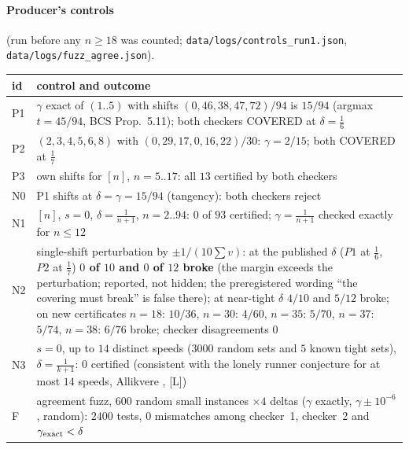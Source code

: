 \documentclass[10pt]{article}
\newcommand{\tier}[1]{\textsf{[#1]}}
\newcommand{\tL}{\tier{L}}
\begin{document}
\paragraph{Producer's controls} (run before any $n\ge18$ was counted; \texttt{data/logs/controls\_run1.json}, \texttt{data/logs/fuzz\_agree.json}).
\begin{center}\small\begin{tabular}{l p{12.2cm}}\toprule
id & control and outcome\\\midrule
P1 & $\gamma$ exact of $(1..5)$ with shifts $(0,46,38,47,72)/94$ is $15/94$ (argmax $t=45/94$, BCS Prop.~5.11); both checkers COVERED at $\delta=\frac16$\\
P2 & $(2,3,4,5,6,8)$ with $(0,29,17,0,16,22)/30$: $\gamma=2/15$; both COVERED at $\frac17$\\
P3 & own shifts for $[n]$, $n=5..17$: all $13$ certified by both checkers\\
N0 & P1 shifts at $\delta=\gamma=15/94$ (tangency): both checkers reject\\
N1 & $[n]$, $s=0$, $\delta=\frac1{n+1}$, $n=2..94$: $0$ of $93$ certified; $\gamma=\frac1{n+1}$ checked exactly for $n\le12$\\
N2 & single-shift perturbation by $\pm1/(10\sum v)$: at the published $\delta$ ($P1$ at $\frac16$, $P2$ at $\frac17$) \textbf{$0$ of $10$ and $0$ of $12$ broke} (the margin exceeds the perturbation; reported, not hidden; the preregistered wording ``the covering must break'' is false there); at near-tight $\delta$ $4/10$ and $5/12$ broke; on new certificates $n=18$: $10/36$, $n=30$: $4/60$, $n=35$: $5/70$, $n=37$: $5/74$, $n=38$: $6/76$ broke; checker disagreements $0$\\
N3 & $s=0$, up to $14$ distinct speeds ($3000$ random sets and $5$ known tight sets), $\delta=\frac1{k+1}$: $0$ certified (consistent with the lonely runner conjecture for at most $14$ speeds, Allikvere \cite{alli}, \tL)\\
F & agreement fuzz, $600$ random small instances $\times4$ deltas ($\gamma$ exactly, $\gamma\pm10^{-6}$, random): $2400$ tests, $0$ mismatches among checker~1, checker~2 and $\gamma_{\rm exact}<\delta$\\\bottomrule
\end{tabular}\end{center}
\end{document}
